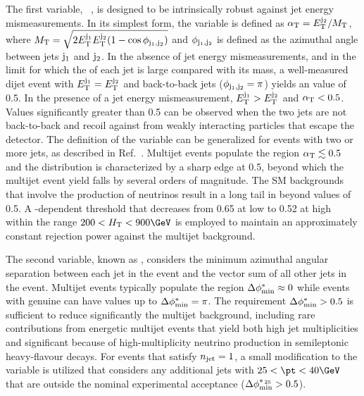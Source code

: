 The first variable, \alphat~\cite{Randall:2008rw, Khachatryan:2011tk},
is designed to be intrinsically robust against jet energy
mismeasurements. In its simplest form, the \alphat variable is defined
as $\alpha_{\mathrm{T}} = E_{\mathrm{T}}^{\mathrm{j}_\text{2}}/M_\mathrm{T}$, where $M_\mathrm{T} = \sqrt{ 2
  E_{\mathrm{T}}^{\mathrm{j}_\text{1}} E_{\mathrm{T}}^{\mathrm{j}_\text{2}} (1 - \cos\phi_{\mathrm{j}_\text{1},\mathrm{j}_\text{2}})}$ and
$\phi_{\mathrm{j}_\text{1},\mathrm{j}_\text{2}}$ is defined as the azimuthal angle between
jets $\mathrm{j}_\text{1}$ and $\mathrm{j}_\text{2}$. In the absence of jet energy
mismeasurements, and in the limit for which the \Et of each jet is
large compared with its mass, a well-measured dijet event with
$E_{\mathrm{T}}^{\mathrm{j}_\text{1}} = E_{\mathrm{T}}^{\mathrm{j}_\text{2}}$ and back-to-back jets
($\phi_{\mathrm{j}_\text{1},\mathrm{j}_\text{2}} = \pi$) yields an \alphat value of 0.5. In
the presence of a jet energy mismeasurement, $E_{\mathrm{T}}^{\mathrm{j}_\text{1}} >
E_{\mathrm{T}}^{\mathrm{j}_\text{2}}$ and $\alpha_{\mathrm{T}} < 0.5$. Values significantly greater than
0.5 can be observed when the two jets are not back-to-back and recoil
against \ptvecmiss from weakly interacting particles that escape the
detector. The definition of the \alphat variable can be generalized
for events with two or more jets, as described in
Ref.~\cite{Khachatryan:2011tk}. Multijet events populate the region
$\alpha_{\mathrm{T}} \lesssim 0.5$ and the \alphat distribution is characterized
by a sharp edge at 0.5, beyond which the multijet event yield falls by
several orders of magnitude. The SM backgrounds that involve the
production of neutrinos result in a long tail in \alphat beyond values
of 0.5. A \scalht-dependent \alphat threshold that decreases from 0.65
at low \scalht to 0.52 at high \scalht within the range $200 < \scalht
< 900\GeV$ is employed to maintain an approximately constant rejection
power against the multijet background. 

The second variable, known as \bdphi, considers the minimum azimuthal
angular separation between each jet in the event and the vector \pt
sum of all other jets in the event. Multijet events typically populate
the region $\Delta\phi^{*}_\text{min} \approx 0$ while events with genuine \ptvecmiss can
have values up to $\Delta\phi^{*}_\text{min} = \pi$. The requirement $\Delta\phi^{*}_\text{min} > 0.5$ is
sufficient to reduce significantly the multijet background, including
rare contributions from energetic multijet events that yield both high
jet multiplicities and significant \ptvecmiss because of
high-multiplicity neutrino production in semileptonic heavy-flavour
decays. For events that satisfy $n_{\text{jet}} = 1$, a small modification to
the \bdphi variable is utilized that considers any additional jets
with $25 < \pt < 40\GeV$ that are outside the nominal experimental
acceptance ($\Delta\phi^{*_{\, 25}}_\text{min} > 0.5$).

